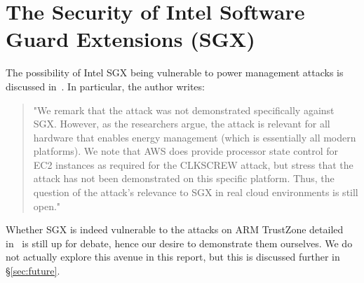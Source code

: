 \section{The Security of Intel Software Guard Extensions (SGX)}

The possibility of Intel SGX being vulnerable to power management attacks is
discussed in~\cite{securityOfSGX}. In particular, the author writes:

\begin{quotation}
    "We remark that the \clkscrew{} attack was not demonstrated specifically
    against SGX. However, as the researchers argue, the attack is relevant for
    all hardware that enables energy management (which is essentially all modern
    platforms). We note that AWS does provide processor state control for EC2
    instances as required for the CLKSCREW attack, but stress that the attack
    has not been demonstrated on this specific platform. Thus, the question of
    the attack’s relevance to SGX in real cloud environments is still open."
\end{quotation}

Whether SGX is indeed vulnerable to the attacks on ARM TrustZone detailed
in~\cite{clkscrew} is still up for debate, hence our desire to demonstrate them
ourselves. We do not actually explore this avenue in this report, but this is
discussed further in §\ref{sec:future}.
